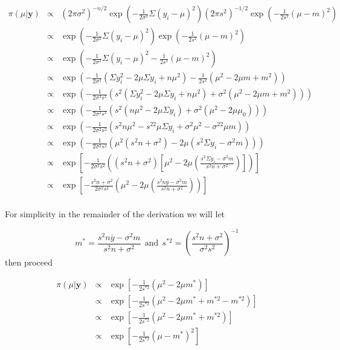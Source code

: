 \documentclass[12pt]{article}
\newcommand{\ybar}{\overline{y}}
\begin{document}
\begin{eqnarray*}
\pi(\mu|\mathbf{y}) &\propto& (2\pi\sigma^2)^{-n/2}\exp\left(-\frac{1}{2\sigma^2}\Sigma(y_i-\mu)^2\right)(2\pi s^2)^{-1/2}\exp\left(-\frac{1}{2s^2}(\mu-m)^2\right) \\
&\propto& \exp\left(-\frac{1}{2\sigma^2}\Sigma(y_i-\mu)^2\right)\exp\left(-\frac{1}{2 s^2}(\mu-m)^2\right) \\
&\propto& \exp\left(-\frac{1}{2\sigma^2}\Sigma(y_i-\mu)^2-\frac{1}{2 s^2}(\mu-m)^2\right) \\
&\propto& \exp\left(-\frac{1}{2\sigma^2}(\Sigma y_i^2-2\mu\Sigma y_i+n\mu^2)-\frac{1}{2 s^2}(\mu^2-2\mu m+m^2)\right) \\
&\propto& \exp\left(-\frac{1}{2\sigma^2 s^2}\left(s^2(\Sigma y_i^2-2\mu\Sigma y_i+n\mu^2)+\sigma^2(\mu^2-2\mu m+m^2)\right)\right) \\
&\propto& \exp\left(-\frac{1}{2\sigma^2 s^2}\left(s^2(n\mu^2-2\mu\Sigma y_i)+\sigma^2(\mu^2-2\mu\mu_0)\right)\right) \\
&\propto& \exp\left(-\frac{1}{2\sigma^2 s^2}\left(s^2n\mu^2-s^22\mu\Sigma y_i+\sigma^2\mu^2-\sigma^22\mu m\right)\right) \\
&\propto& \exp\left(-\frac{1}{2\sigma^2 s^2}\left(\mu^2(s^2n+\sigma^2)-2\mu(s^2\Sigma y_i-\sigma^2m)\right)\right) \\
&\propto& \exp\left[-\frac{1}{2\sigma^2 s^2}\left((s^2n+\sigma^2)\left[\mu^2-2\mu\left(\frac{s^2\Sigma y_i-\sigma^2m}{s^2n+\sigma^2}\right)\right]\right)\right] \\
&\propto& \exp\left[-\frac{s^2n+\sigma^2}{2\sigma^2s^2}\left(\mu^2-2\mu\left(\frac{s^2n\ybar-\sigma^2m}{s^2n+\sigma^2}\right)\right)\right] \\
\end{eqnarray*}

\noindent For simplicity in the remainder of the derivation we will let 

\[m^*=\frac{s^2n\ybar-\sigma^2m}{s^2n+\sigma^2}\ \ \mathrm{and}\ \ s^{*2}=\left(\frac{s^2n+\sigma^2}{\sigma^2s^2}\right)^{-1}\]
\noindent then proceed

\begin{eqnarray*}
\pi(\mu|\mathbf{y}) &\propto& \exp\left[-\frac{1}{2s^{*2}}\left(\mu^2-2\mu m^*\right)\right] \\
&\propto& \exp\left[-\frac{1}{2s^{*2}}\left(\mu^2-2\mu m^*+m^{*2}-m^{*2}\right)\right] \\
&\propto& \exp\left[-\frac{1}{2s^{*2}}\left(\mu^2-2\mu m^*+m^{*2}\right)\right] \\
&\propto& \exp\left[-\frac{1}{2s^{*2}}\left(\mu-m^*\right)^2\right] \\
\end{eqnarray*}
\end{document}
